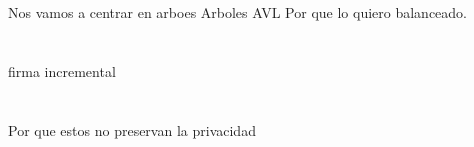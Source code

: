 \documentclass[10pt]{beamer}
\begin{document}
\section{}
\begin{frame}
\frametitle{}
Nos vamos a centrar en arboes
Arboles AVL
Por que lo quiero balanceado.
\end{frame}

\section{}
\begin{frame}
\frametitle{}
firma incremental

\end{frame}


\section{}
\begin{frame}
\frametitle{}
Por que estos no preservan la privacidad

\end{frame}
\end{document}
